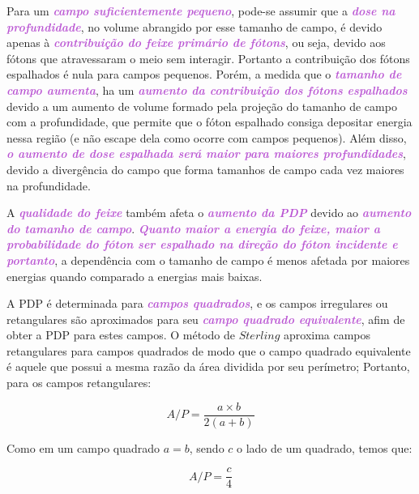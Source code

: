 \documentclass[11pt,a4paper]{article}
\begin{document}
	Para um \textcolor{MediumOrchid}{\textbf{\textit{campo suficientemente pequeno}}}, pode-se assumir que a \textcolor{MediumOrchid}{\textbf{\textit{dose na profundidade}}}, no volume abrangido por esse tamanho de campo, é devido apenas à \textcolor{MediumOrchid}{\textbf{\textit{contribuição do feixe primário de fótons}}}, ou seja, devido aos fótons que atravessaram o meio sem interagir. Portanto a contribuição dos fótons espalhados é nula para campos pequenos. Porém, a medida que o \textcolor{MediumOrchid}{\textbf{\textit{tamanho de campo aumenta}}}, ha um \textcolor{MediumOrchid}{\textbf{\textit{aumento da contribuição dos fótons espalhados}}} devido a um aumento de volume formado pela projeção do tamanho de campo com a profundidade, que permite que o fóton espalhado consiga depositar energia nessa região (e não escape dela como ocorre com campos pequenos). Além disso, \textcolor{MediumOrchid}{\textbf{\textit{o aumento de dose espalhada será maior para maiores profundidades}}}, devido a divergência do campo que forma tamanhos de campo cada vez maiores na profundidade.

	A \textcolor{MediumOrchid}{\textbf{\textit{qualidade do feixe}}} também afeta o \textcolor{MediumOrchid}{\textbf{\textit{aumento da PDP}}} devido ao \textcolor{MediumOrchid}{\textbf{\textit{aumento do tamanho de campo}}}. \textcolor{MediumOrchid}{\textbf{\textit{Quanto maior a energia do feixe, maior a probabilidade do fóton ser espalhado na direção do fóton incidente e portanto}}}, a dependência com o tamanho de campo é menos afetada por maiores energias quando comparado a energias mais baixas.

	A PDP é determinada para \textcolor{MediumOrchid}{\textbf{\textit{campos quadrados}}}, e os campos irregulares ou retangulares são aproximados para seu \textcolor{MediumOrchid}{\textbf{\textit{campo quadrado equivalente}}}, afim de obter a PDP para estes campos. O método de $Sterling$ aproxima campos retangulares para campos quadrados de modo que o campo quadrado equivalente é aquele que possui a mesma razão da área dividida por seu perímetro; Portanto, para os campos retangulares:

	\begin{equation}
		A/P = \frac{a \times b}{2(a + b)}
	\end{equation}

	Como em um campo quadrado $a = b$, sendo $c$ o lado de um quadrado, temos que:

	\begin{equation}
		A/P = \frac{c}{4}
		\label{eq:quadradoEquivalente}
	\end{equation}
\end{document}
